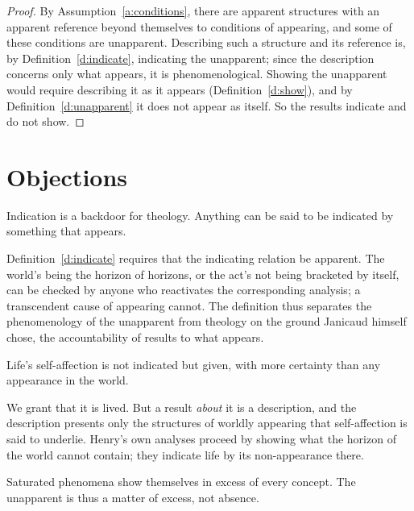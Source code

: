 \documentclass{situationist-preprint}
\begin{document}
\begin{proof}
By Assumption~\ref{a:conditions}, there are apparent structures with an apparent reference beyond themselves to conditions of appearing, and some of these conditions are unapparent. Describing such a structure and its reference is, by Definition~\ref{d:indicate}, indicating the unapparent; since the description concerns only what appears, it is phenomenological. Showing the unapparent would require describing it as it appears (Definition~\ref{d:show}), and by Definition~\ref{d:unapparent} it does not appear as itself. So the results indicate and do not show.
\end{proof}

\section{Objections}

\begin{objection}[Janicaud]
Indication is a backdoor for theology. Anything can be said to be indicated by something that appears.
\end{objection}

\begin{reply}
Definition~\ref{d:indicate} requires that the indicating relation be apparent. The world's being the horizon of horizons, or the act's not being bracketed by itself, can be checked by anyone who reactivates the corresponding analysis; a transcendent cause of appearing cannot. The definition thus separates the phenomenology of the unapparent from theology on the ground Janicaud himself chose, the accountability of results to what appears.
\end{reply}

\begin{objection}[Henry]
Life's self-affection is not indicated but given, with more certainty than any appearance in the world.
\end{objection}

\begin{reply}
We grant that it is lived. But a result \emph{about} it is a description, and the description presents only the structures of worldly appearing that self-affection is said to underlie. Henry's own analyses proceed by showing what the horizon of the world cannot contain; they indicate life by its non-appearance there.
\end{reply}

\begin{objection}[Marion]
Saturated phenomena show themselves in excess of every concept. The unapparent is thus a matter of excess, not absence.
\end{objection}
\end{document}
